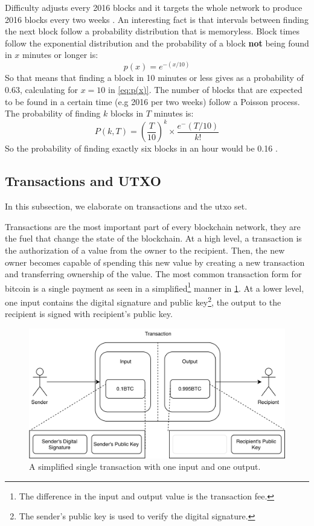 Difficulty adjusts every 2016 blocks and it targets the whole network to produce 2016 blocks every two weeks \cite{difficulty}. An interesting fact is that intervals between finding the next block follow a probability distribution that is memoryless. Block times follow the exponential distribution and the probability of a block \textbf{not} being found in $x$ minutes or longer is: 
\begin{equation}
\label{eq:p(x)}
    p(x) = e^{-(x/10)}
\end{equation}
So that means that finding a block in 10 minutes or less gives as a probability of 0.63, calculating for $x=10$ in \ref{eq:p(x)}. The number of blocks that are expected to be found in a certain time (e.g 2016 per two weeks) follow a Poisson process. The probability of finding $k$ blocks in $T$ minutes is:
\begin{equation}
    P(k,T) = ({\frac{T}{10}})^k \times \frac{e^-({T/10})}{k!}
\end{equation}
So the probability of finding exactly six blocks in an hour would be 0.16 \cite{bowden2018block}.

\subsection{Transactions and UTXO}
In this subsection, we elaborate on transactions and the \acrfull{utxo} set.

Transactions are the most important part of every blockchain network, they are the fuel that change the state of the blockchain. At a high level, a transaction is the authorization of a value from the owner to the recipient. Then, the new owner becomes capable of spending this new value by creating a new transaction and transferring ownership of the value. The most common transaction form for bitcoin is a single payment as seen in a simplified\footnote{The difference in the input and output value is the transaction fee.} manner in \ref{fig:btc-tx}. At a lower level, one input contains the digital signature and public key\footnote{The sender's public key is used to verify the digital signature.}, the output to the recipient is signed with recipient's public key.
\begin{figure}[h]
    \centering
    \includegraphics[width=1\textwidth]{images/btc-tx.png}
    \caption{A simplified single transaction with one input and one output.}
    \label{fig:btc-tx}
\end{figure}

